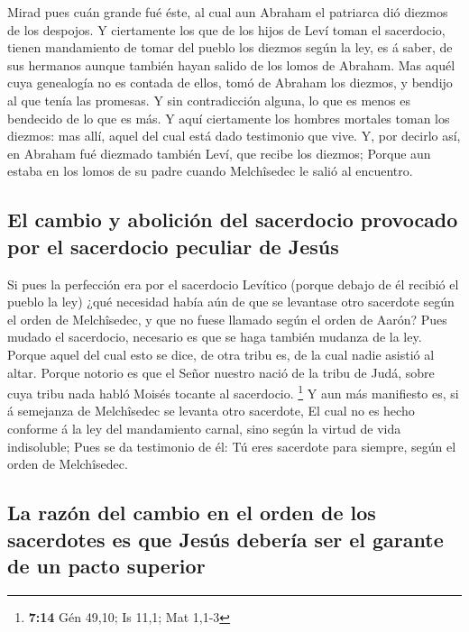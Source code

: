  Mirad pues cuán grande fué éste, al cual aun Abraham el
patriarca dió diezmos de los despojos.  Y ciertamente los
que de los hijos de Leví toman el sacerdocio, tienen mandamiento de
tomar del pueblo los diezmos según la ley, es á saber, de sus hermanos
aunque también hayan salido de los lomos de Abraham.  Mas
aquél cuya genealogía no es contada de ellos, tomó de Abraham los
diezmos, y bendijo al que tenía las promesas.  Y sin
contradicción alguna, lo que es menos es bendecido de lo que es más.
 Y aquí ciertamente los hombres mortales toman los diezmos:
mas allí, aquel del cual está dado testimonio que vive.  Y,
por decirlo así, en Abraham fué diezmado también Leví, que recibe los
diezmos;  Porque aun estaba en los lomos de su padre cuando
Melchîsedec le salió al encuentro.

\hypertarget{el-cambio-y-aboliciuxf3n-del-sacerdocio-provocado-por-el-sacerdocio-peculiar-de-jesuxfas}{%
\subsection{El cambio y abolición del sacerdocio provocado por el
sacerdocio peculiar de
Jesús}\label{el-cambio-y-aboliciuxf3n-del-sacerdocio-provocado-por-el-sacerdocio-peculiar-de-jesuxfas}}

 Si pues la perfección era por el sacerdocio Levítico
(porque debajo de él recibió el pueblo la ley) ¿qué necesidad había aún
de que se levantase otro sacerdote según el orden de Melchîsedec, y que
no fuese llamado según el orden de Aarón?  Pues mudado el
sacerdocio, necesario es que se haga también mudanza de la ley.
 Porque aquel del cual esto se dice, de otra tribu es, de
la cual nadie asistió al altar.  Porque notorio es que el
Señor nuestro nació de la tribu de Judá, sobre cuya tribu nada habló
Moisés tocante al sacerdocio. \footnote{\textbf{7:14} Gén 49,10; Is
  11,1; Mat 1,1-3}  Y aun más manifiesto es, si á semejanza
de Melchîsedec se levanta otro sacerdote,  El cual no es
hecho conforme á la ley del mandamiento carnal, sino según la virtud de
vida indisoluble;  Pues se da testimonio de él: Tú eres
sacerdote para siempre, según el orden de Melchîsedec.

\hypertarget{la-razuxf3n-del-cambio-en-el-orden-de-los-sacerdotes-es-que-jesuxfas-deberuxeda-ser-el-garante-de-un-pacto-superior}{%
\subsection{La razón del cambio en el orden de los sacerdotes es que
Jesús debería ser el garante de un pacto
superior}\label{la-razuxf3n-del-cambio-en-el-orden-de-los-sacerdotes-es-que-jesuxfas-deberuxeda-ser-el-garante-de-un-pacto-superior}}

